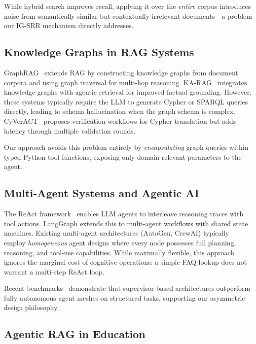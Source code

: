 \documentclass[runningheads]{llncs}
\begin{document}
While hybrid search improves recall, applying it over the \emph{entire} corpus introduces noise from semantically similar but contextually irrelevant documents---a problem our IG-SRR mechanism directly addresses.

\subsection{Knowledge Graphs in RAG Systems}
\label{sec:kg_related}

GraphRAG~\cite{edge2024graphrag} extends RAG by constructing knowledge graphs from document corpora and using graph traversal for multi-hop reasoning. KA-RAG~\cite{karag2024} integrates knowledge graphs with agentic retrieval for improved factual grounding. However, these systems typically require the LLM to generate Cypher or SPARQL queries directly, leading to schema hallucination when the graph schema is complex. CyVerACT~\cite{cyveract2024} proposes verification workflows for Cypher translation but adds latency through multiple validation rounds.

Our approach avoids this problem entirely by \emph{encapsulating} graph queries within typed Python tool functions, exposing only domain-relevant parameters to the agent.

\subsection{Multi-Agent Systems and Agentic AI}
\label{sec:mas_related}

The ReAct framework~\cite{yao2023react} enables LLM agents to interleave reasoning traces with tool actions. LangGraph extends this to multi-agent workflows with shared state machines. Existing multi-agent architectures (AutoGen, CrewAI) typically employ \emph{homogeneous} agent designs where every node possesses full planning, reasoning, and tool-use capabilities. While maximally flexible, this approach ignores the marginal cost of cognitive operations: a simple FAQ lookup does not warrant a multi-step ReAct loop.

Recent benchmarks~\cite{langgraph_benchmark2024} demonstrate that supervisor-based architectures outperform fully autonomous agent meshes on structured tasks, supporting our asymmetric design philosophy.

\subsection{Agentic RAG in Education}
\label{sec:education_rag}
\end{document}
